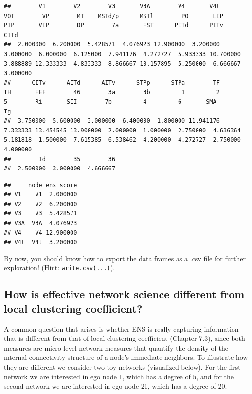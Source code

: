 \documentclass[
]{book}
\newenvironment{Shaded}{\begin{snugshade}}{\end{snugshade}}
\newcommand{\AttributeTok}[1]{\textcolor[rgb]{0.13,0.29,0.53}{#1}}
\newcommand{\FunctionTok}[1]{\textcolor[rgb]{0.13,0.29,0.53}{\textbf{#1}}}
\newcommand{\NormalTok}[1]{#1}
\newcommand{\OtherTok}[1]{\textcolor[rgb]{0.56,0.35,0.01}{#1}}
\newcommand{\SpecialCharTok}[1]{\textcolor[rgb]{0.81,0.36,0.00}{\textbf{#1}}}
\begin{document}
\begin{verbatim}
##        V1        V2        V3       V3A        V4       V4t       VOT        VP        MT    MSTd/p      MSTl        PO       LIP       PIP       VIP        DP        7a       FST      PITd      PITv      CITd 
##  2.000000  6.200000  5.428571  4.076923 12.900000  3.200000  3.000000  6.000000  6.125000  7.941176  4.272727  5.933333 10.700000  3.888889 12.333333  4.833333  8.866667 10.157895  5.250000  6.666667  3.000000 
##      CITv      AITd      AITv      STPp      STPa        TF        TH       FEF        46        3a        3b         1         2         5        Ri       SII        7b         4         6       SMA        Ig 
##  3.750000  5.600000  3.000000  6.400000  1.800000 11.941176  7.333333 13.454545 13.900000  2.000000  1.000000  2.750000  4.636364  5.181818  1.500000  7.615385  6.538462  4.200000  4.272727  2.750000  4.000000 
##        Id        35        36 
##  2.500000  3.000000  4.666667
\end{verbatim}

\begin{Shaded}
\end{Shaded}

\begin{verbatim}
##     node ens_score
## V1    V1  2.000000
## V2    V2  6.200000
## V3    V3  5.428571
## V3A  V3A  4.076923
## V4    V4 12.900000
## V4t  V4t  3.200000
\end{verbatim}

By now, you should know how to export the data frames as a .csv file for further exploration! (Hint: \texttt{write.csv(...)}).

\subsection{How is effective network science different from local clustering coefficient?}\label{how-is-effective-network-science-different-from-local-clustering-coefficient}

A common question that arises is whether ENS is really capturing information that is different from that of local clustering coefficient (Chapter 7.3), since both measures are micro-level network measures that quantify the density of the internal connectivity structure of a node's immediate neighbors. To illustrate how they are different we consider two toy networks (visualized below). For the first network we are interested in ego node 1, which has a degree of 5, and for the second network we are interested in ego node 21, which has a degree of 20.
\end{document}
